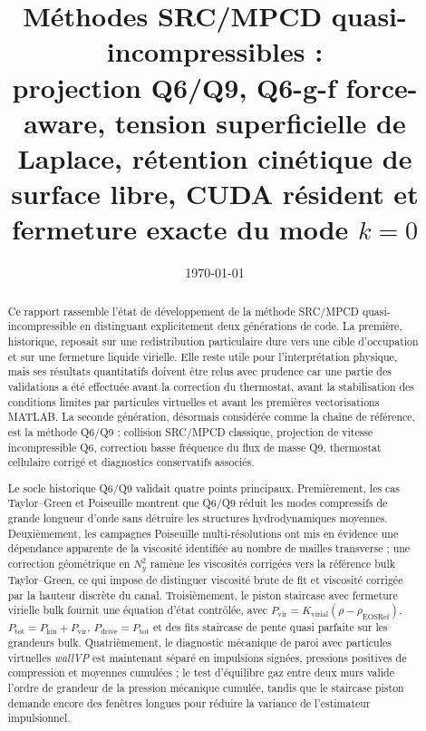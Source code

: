 \documentclass[11pt,a4paper]{article}
\title{Méthodes SRC/MPCD quasi-incompressibles :\\ projection Q6/Q9, Q6-g-f force-aware, tension superficielle de Laplace, rétention cinétique de surface libre, CUDA résident et fermeture exacte du mode $k=0$}
\author{}
\date{\today}
\begin{document}
\maketitle



\begin{abstract}
Ce rapport rassemble l'état de développement de la méthode SRC/MPCD quasi-incompressible en distinguant explicitement deux générations de code. La première, historique, reposait sur une redistribution particulaire dure vers une cible d'occupation et sur une fermeture liquide virielle. Elle reste utile pour l'interprétation physique, mais ses résultats quantitatifs doivent être relus avec prudence car une partie des validations a été effectuée avant la correction du thermostat, avant la stabilisation des conditions limites par particules virtuelles et avant les premières vectorisations MATLAB. La seconde génération, désormais considérée comme la chaîne de référence, est la méthode Q6/Q9 : collision SRC/MPCD classique, projection de vitesse incompressible Q6, correction basse fréquence du flux de masse Q9, thermostat cellulaire corrigé et diagnostics conservatifs associés.

Le socle historique Q6/Q9 validait quatre points principaux. Premièrement, les cas Taylor--Green et Poiseuille montrent que Q6/Q9 réduit les modes compressifs de grande longueur d'onde sans détruire les structures hydrodynamiques moyennes. Deuxièmement, les campagnes Poiseuille multi-résolutions ont mis en évidence une dépendance apparente de la viscosité identifiée au nombre de mailles transverse ; une correction géométrique en \(N_y^2\) ramène les viscosités corrigées vers la référence bulk Taylor--Green, ce qui impose de distinguer viscosité brute de fit et viscosité corrigée par la hauteur discrète du canal. Troisièmement, le piston staircase avec fermeture virielle bulk fournit une équation d'état contrôlée, avec \(P_{\mathrm{vir}}=K_{\mathrm{virial}}(\rho-\rho_{\mathrm{EOSRef}})\), \(P_{\mathrm{tot}}=P_{\mathrm{kin}}+P_{\mathrm{vir}}\), \(P_{\mathrm{drive}}=P_{\mathrm{tot}}\) et des fits staircase de pente quasi parfaite sur les grandeurs bulk. Quatrièmement, le diagnostic mécanique de paroi avec particules virtuelles \emph{wallVP} est maintenant séparé en impulsions signées, pressions positives de compression et moyennes cumulées ; le test d'équilibre gaz entre deux murs valide l'ordre de grandeur de la pression mécanique cumulée, tandis que le staircase piston demande encore des fenêtres longues pour réduire la variance de l'estimateur impulsionnel.




\end{abstract}
\end{document}
